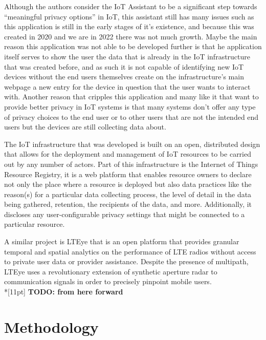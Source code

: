\documentclass[conference]{IEEEtran}
\begin{document}
Although the authors consider the IoT Assistant to be a significant step towards
``meaningful privacy options'' in IoT, this assistant still has many issues such as
this application is still in the early stages of it's existence, and because this was
created in 2020 and we are in 2022 there was not much growth. Maybe the main reason
this application was not able to be developed further is that he application itself
serves to show the user the data that is already in the IoT infrastructure that was created before,
and as such it is not capable of identifying new IoT devices without the end users themselves
create on the infrastructure's main webpage \cite{DasPersonalized} a new entry for the device in question that the
user wants to interact with. Another reason that cripples this application and many like
it that want to provide better privacy in IoT systems is that many systems don't
offer any type of privacy choices to the end user or to other users that are not
the intended end users but the devices are still collecting data about.

The IoT infrastructure that was developed \cite{DasPersonalized} is built on an open, distributed design
that allows for the deployment and management of IoT resources to be carried out
by any number of actors. Part of this infrastructure is the Internet of Things Resource Registry,
it is a web platform that enables resource owners to declare not only the place where a
resource is deployed but also data practices like the reason(s) for a particular data collecting
process, the level of detail in the data being gathered, retention, the recipients of the data,
and more. Additionally, it discloses any user-configurable privacy settings that might be
connected to a particular resource.

A similar project is LTEye \cite{KumarLTE} that is an open
platform that provides granular temporal and spatial analytics on the performance of LTE
radios without access to private user data or provider assistance. Despite the presence of
multipath, LTEye uses a revolutionary extension of synthetic aperture radar to communication
signals in order to precisely pinpoint mobile users.
\\*[11pt]
\textbf{TODO: from here forward}


\section{Methodology}
\end{document}
